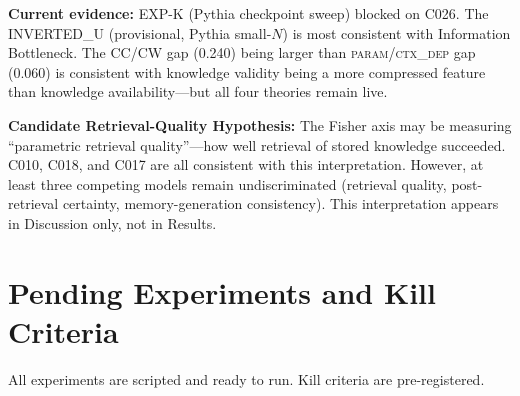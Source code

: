 \documentclass[11pt]{article}
\begin{document}
\textbf{Current evidence:} EXP-K (Pythia checkpoint sweep) blocked on C026.
The INVERTED\_U (provisional, Pythia small-$N$) is most consistent with Information
Bottleneck. The CC/CW gap (0.240) being larger than \textsc{param}/\textsc{ctx\_dep}
gap (0.060) is consistent with knowledge validity being a more compressed feature than
knowledge availability---but all four theories remain live.

\textbf{Candidate Retrieval-Quality Hypothesis:} The Fisher axis may be measuring
``parametric retrieval quality''---how well retrieval of stored knowledge succeeded. C010,
C018, and C017 are all consistent with this interpretation. However, at least three
competing models remain undiscriminated (retrieval quality, post-retrieval certainty,
memory-generation consistency). This interpretation appears in Discussion only, not in
Results.

\section{Pending Experiments and Kill Criteria}
\label{sec:pending}

All experiments are scripted and ready to run. Kill criteria are pre-registered.
\end{document}
